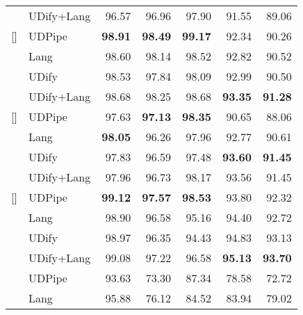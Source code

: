 \documentclass[11pt,a4paper]{article}
\begin{document}
\begin{table}[!t]
\begin{center}
\begin{tabularx}{\linewidth}{@{}Xlrrrrr@{}}
        & UDify+Lang &      96.57 &      96.96 &      97.90 &      91.55 &      89.06 \\
    \addlinespace[5pt]
    [\normalbaselineskip]{}
        & UDPipe     &  \bf 98.91 &  \bf 98.49 &  \bf 99.17 &      92.34 &      90.26 \\
    \addlinespace[2pt]
        & Lang       &      98.60 &      98.14 &      98.52 &      92.82 &      90.52 \\
        & UDify      &      98.53 &      97.84 &      98.09 &      92.99 &      90.50 \\
        & UDify+Lang &      98.68 &      98.25 &      98.68 &  \bf 93.35 &  \bf 91.28 \\
    \addlinespace[5pt]
    [\normalbaselineskip]{}
        & UDPipe     &      97.63 &  \bf 97.13 &  \bf 98.35 &      90.65 &      88.06 \\
    \addlinespace[2pt]
        & Lang       &  \bf 98.05 &      96.26 &      97.96 &      92.77 &      90.61 \\
        & UDify      &      97.83 &      96.59 &      97.48 &  \bf 93.60 &  \bf 91.45 \\
        & UDify+Lang &      97.96 &      96.73 &      98.17 &      93.56 &      91.45 \\
    \addlinespace[5pt]
    [\normalbaselineskip]{\vspace{-10pt} }
        & UDPipe     &  \bf 99.12 &  \bf 97.57 &  \bf 98.53 &      93.80 &      92.32 \\
    \addlinespace[2pt]
        & Lang       &      98.90 &      96.58 &      95.16 &      94.40 &      92.72 \\
        & UDify      &      98.97 &      96.35 &      94.43 &      94.83 &      93.13 \\
        & UDify+Lang &      99.08 &      97.22 &      96.58 &  \bf 95.13 &  \bf 93.70 \\
    \midrule
    [\normalbaselineskip]{}
        & UDPipe     &      93.63 &      73.30 &      87.34 &      78.58 &      72.72 \\
    \addlinespace[2pt]
        & Lang       &      95.88 &      76.12 &      84.52 &      83.94 &      79.02 \\

\end{tabularx}
\end{center}
\end{table}
\end{document}
